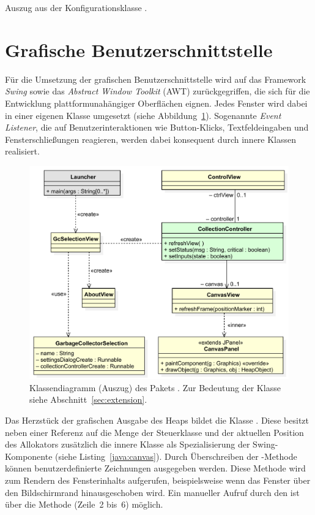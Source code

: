 \begin{listing}[h]
	\inputminted[]{java}{code/Settings.java}
	\caption[Auszug aus der Konfigurationsklasse ]{Auszug aus der Konfigurationsklasse .}
	\label{java:settings}
\end{listing}

\section{Grafische Benutzerschnittstelle}
\label{sec:gui}
Für die Umsetzung der grafischen Benutzerschnittstelle wird auf das Framework \textit{Swing} sowie das \textit{Abstract Window Toolkit} (AWT) zurückgegriffen, die sich für die Entwicklung plattformunahängiger Oberflächen eignen.
Jedes Fenster wird dabei in einer eigenen Klasse umgesetzt (siehe Abbildung~\ref{fig:gui}).
Sogenannte \textit{Event Listener}, die auf Benutzerinteraktionen wie Button-Klicks, Textfeldeingaben und Fensterschließungen reagieren, werden dabei konsequent durch innere Klassen
realisiert.

\begin{figure}[h]
	\centering
	\includegraphics[scale=0.6]{img/uml/ch7-gui.pdf}
	\caption[Klassendiagramm des Pakets ]{Klassendiagramm (Auszug) des Pakets . Zur Bedeutung der Klasse  siehe Abschnitt~\ref{sec:extension}.}
	\label{fig:gui}
\end{figure}

Das Herzstück der grafischen Ausgabe des Heaps bildet die Klasse .
Diese besitzt neben einer Referenz auf die Menge  der Steuerklasse und der aktuellen Position des Allokators zusätzlich die innere Klasse  als Spezialisierung der Swing-Komponente  (siehe Listing~\ref{java:canvas}).
Durch Überschreiben der -Methode können benutzerdefinierte Zeichnungen ausgegeben werden.
Diese Methode wird zum Rendern des Fensterinhalts aufgerufen, beispielsweise wenn das Fenster über den Bildschirmrand hinausgeschoben wird.
Ein manueller Aufruf durch den  ist über die Methode  (Zeile~2 bis~6) möglich.

